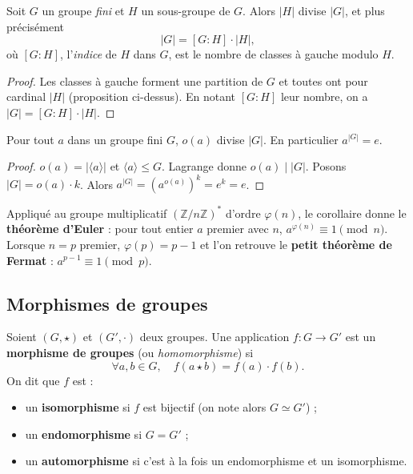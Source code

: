 \begin{theoreme}[Lagrange]
Soit $G$ un groupe \emph{fini} et $H$ un sous-groupe de $G$. Alors $|H|$ divise $|G|$, et plus précisément
\[ |G| = [G : H] \cdot |H|, \]
où $[G : H]$, l'\emph{indice} de $H$ dans $G$, est le nombre de classes à gauche modulo $H$.
\end{theoreme}

\begin{proof}
Les classes à gauche forment une partition de $G$ et toutes ont pour cardinal $|H|$ (proposition ci-dessus). En notant $[G : H]$ leur nombre, on a $|G| = [G : H] \cdot |H|$.
\end{proof}

\begin{corollaire}
Pour tout $a$ dans un groupe fini $G$, $o(a)$ divise $|G|$. En particulier $a^{|G|} = e$.
\end{corollaire}

\begin{proof}
$o(a) = |\langle a \rangle|$ et $\langle a \rangle \le G$. Lagrange donne $o(a) \mid |G|$. Posons $|G| = o(a) \cdot k$. Alors $a^{|G|} = (a^{o(a)})^k = e^k = e$.
\end{proof}

\begin{remarque}
Appliqué au groupe multiplicatif $(\mathbb{Z}/n\mathbb{Z})^*$ d'ordre $\varphi(n)$, le corollaire donne le \textbf{théorème d'Euler} : pour tout entier $a$ premier avec $n$, $a^{\varphi(n)} \equiv 1 \pmod{n}$. Lorsque $n = p$ premier, $\varphi(p) = p-1$ et l'on retrouve le \textbf{petit théorème de Fermat} : $a^{p-1} \equiv 1 \pmod{p}$.
\end{remarque}

\subsection{Morphismes de groupes}

\begin{definition}
Soient $(G, \star)$ et $(G', \cdot)$ deux groupes. Une application $f : G \to G'$ est un \textbf{morphisme de groupes} (ou \emph{homomorphisme}) si
\[ \forall a, b \in G,\quad f(a \star b) = f(a) \cdot f(b). \]
On dit que $f$ est :
\begin{itemize}
    \item un \textbf{isomorphisme} si $f$ est bijectif (on note alors $G \simeq G'$) ;
    \item un \textbf{endomorphisme} si $G = G'$ ;
    \item un \textbf{automorphisme} si c'est à la fois un endomorphisme et un isomorphisme.
\end{itemize}
\end{definition}

